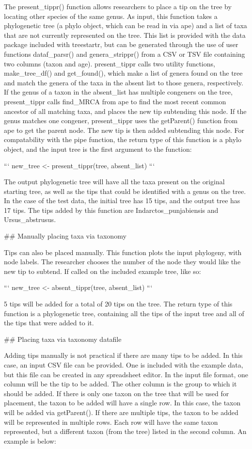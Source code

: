 The present_tippr() function allows researchers to place a tip on the tree by locating other species of the same genus.
As input, this function takes a phylogenetic tree (a phylo object, which can be read in via ape) and a list of taxa that are not currently represented on the tree.
This list is provided with the data package included with treestartr, but can be generated through the use of user functions dataf_parsr() and genera_strippr() from a CSV or TSV file containing two columns (taxon and age).
present_tippr calls two utility functions, make_tree_df() and get_found(), which make a list of genera found on the tree and match the genera of the taxa in the absent list to those genera, respectively.
If the genus of a taxon in the absent_list has multiple congeners on the tree, present_tippr calls find_MRCA from ape to find the most recent common ancestor of all matching taxa, and places the new tip subtending this node.
If the genus matches one congener, present_tippr uses the getParent() function from ape to get the parent node.
The new tip is then added subtending this node.
For compatability with the pipe function, the return type of this function is a phylo object, and the input tree is the first argument to the function:

```
new_tree <- present_tippr(tree, absent_list)
```

The output phylogenetic tree will have all the taxa present on the original starting tree, as well as the tips that could be identified with a genus on the tree.
In the case of the test data, the initial tree has 15 tips, and the output tree has 17 tips.
The tips added by this function are Indarctos_punjabiensis and Ursus_abstrusus.

## Manually placing taxa via taxonomy

Tips can also be placed manually. 
This function plots the input phylogeny, with node labels. 
The researcher chooses the number of the node they would like the new tip to subtend.
If called on the included example tree, like so:

```
new_tree <- absent_tippr(tree, absent_list)
```

5 tips will be added for a total of 20 tips on the tree.
The return type of this function is a phylogenetic tree, containing all the tips of the input tree and all of the tips that were added to it.

## Placing taxa via taxonomy datafile

Adding tips manually is not practical if there are many tips to be added.
In this case, an input CSV file can be provided.
One is included with the example data, but this file can be created in any spreadsheet editor.
In the input file format, one column will be the tip to be added.
The other column is the group to which it should be added.
If there is only one taxon on the tree that will be used for placement, the taxon to be added will have a single row.
In this case, the taxon will be added via getParent(). 
If there are multiple tips, the taxon to be added will be represented in multiple rows.
Each row will have the same taxon represented, but a different taxon (from the tree) listed in the second column.
An example is below:

